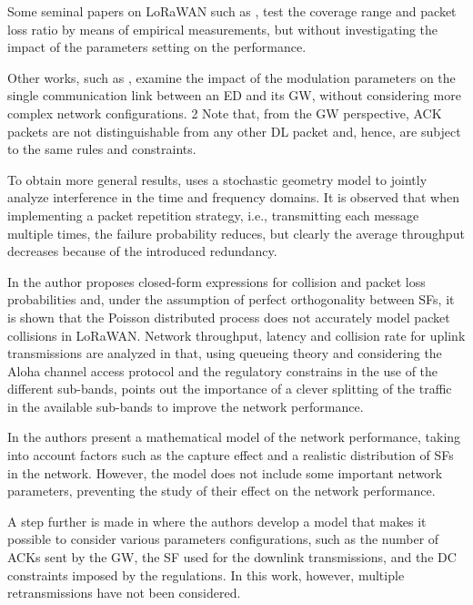Some seminal papers on LoRaWAN such as \cite{petajajarvi_coverage_2015b},
	\cite{wixted_evaluation_2016} test the coverage range and packet loss ratio by means of empirical measurements,
	but without investigating the impact of the parameters setting on the performance.

Other works,
	such as \cite{bor_lora_2017},
	examine the impact of the modulation parameters on the single communication link between an ED and its GW,
	without considering more complex network configurations.
2 Note that,
	from the GW perspective,
	ACK packets are not distinguishable from any other DL packet and,
	hence,
	are subject to the same rules and constraints.

To obtain more general results,
	\cite{li_2d_2016} uses a stochastic geometry model to jointly analyze interference in the time and frequency domains.
It is observed that when implementing a packet repetition strategy,
	i.e.,
	transmitting each message multiple times,
	the failure probability reduces,
	but clearly the average throughput decreases because of the introduced redundancy.

In \cite{ferre_collision_2017a} the author proposes closed-form expressions for collision and packet loss probabilities and,
	under the assumption of perfect orthogonality between SFs,
	it is shown that the Poisson distributed process does not accurately model packet collisions in LoRaWAN.
Network throughput,
	latency and collision rate for uplink transmissions are analyzed in \cite{sorensen_analysis_2017} that,
	using queueing theory and considering the Aloha channel access protocol and the regulatory constrains in the use of the different sub-bands,
	points out the importance of a clever splitting of the traffic in the available sub-bands to improve the network performance.

In \cite{bankov_mathematical_2017a} the authors present a mathematical model of the network performance,
	taking into account factors such as the capture effect and a realistic distribution of SFs in the network.
However,
	the model does not include some important network parameters,
	preventing the study of their effect on the network performance.

A step further is made in \cite{capuzzo_mathematical_2018} where the authors develop a model that makes it possible to consider various parameters configurations,
	such as the number of ACKs sent by the GW,
	the SF used for the downlink transmissions,
	and the DC constraints imposed by the regulations.
In this work,
	however,
	multiple retransmissions have not been considered.

